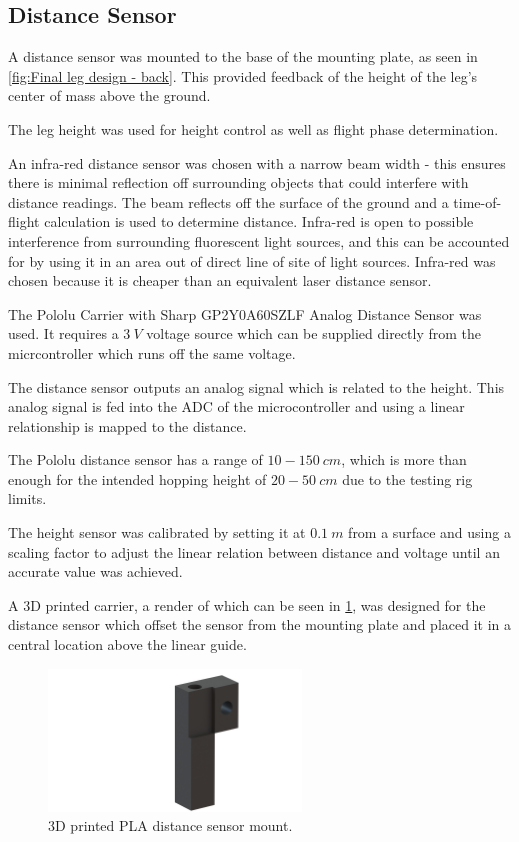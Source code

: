 \subsection{Distance Sensor}
A distance sensor was mounted to the base of the mounting plate, as seen in \cref{fig:Final leg design - back}. This provided feedback of the height of the leg's center of mass above the ground.

The leg height was used for height control as well as flight phase determination.

An infra-red distance sensor was chosen with a narrow beam width - this ensures there is minimal reflection off surrounding objects that could interfere with distance readings. The beam reflects off the surface of the ground and a time-of-flight calculation is used to determine distance. Infra-red is open to possible interference from surrounding fluorescent light sources, and this can be accounted for by using it in an area out of direct line of site of light sources. Infra-red was chosen because it is cheaper than an equivalent laser distance sensor.

The Pololu Carrier with Sharp GP2Y0A60SZLF Analog Distance Sensor was used. It requires a $3\ V$ voltage source which can be supplied directly from the micrcontroller which runs off the same voltage. 

The distance sensor outputs an analog signal which is related to the height. This analog signal is fed into the ADC of the microcontroller and using a linear relationship is mapped to the distance. 

The Pololu distance sensor has a range of $10-150\ cm$, which is more than enough for the intended hopping height of $20-50\ cm$ due to the testing rig limits.

The height sensor was calibrated by setting it at $0.1\ m$ from a surface and using a scaling factor to adjust the linear relation between distance and voltage until an accurate value was achieved. 

A 3D printed carrier, a render of which can be seen in \cref{fig:distance-sensor-mount}, was designed for the distance sensor which offset the sensor from the mounting plate and placed it in a central location above the linear guide.

\begin{figure}
\centering
\includegraphics[clip, trim=4cm 0cm 2cm 0cm, width=0.6\textwidth]{images/mechanical/distance-sensor-mount} 
\caption{3D printed PLA distance sensor mount.}
\label{fig:distance-sensor-mount}
\end{figure}

